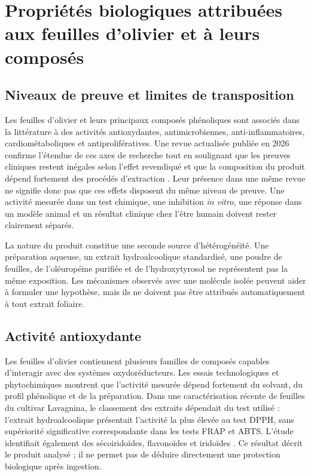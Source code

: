 \section{Propriétés biologiques attribuées aux feuilles d'olivier et à leurs composés}

\subsection{Niveaux de preuve et limites de transposition}

Les feuilles d'olivier et leurs principaux composés phénoliques sont associés dans la littérature à des activités antioxydantes, antimicrobiennes, anti-inflammatoires, cardiométaboliques et antiprolifératives. Une revue actualisée publiée en 2026 confirme l'étendue de ces axes de recherche tout en soulignant que les preuves cliniques restent inégales selon l'effet revendiqué et que la composition du produit dépend fortement des procédés d'extraction \citep{Gokkaya2026}. Leur présence dans une même revue ne signifie donc pas que ces effets disposent du même niveau de preuve. Une activité mesurée dans un test chimique, une inhibition \textit{in vitro}, une réponse dans un modèle animal et un résultat clinique chez l'être humain doivent rester clairement séparés.

La nature du produit constitue une seconde source d'hétérogénéité. Une préparation aqueuse, un extrait hydroalcoolique standardisé, une poudre de feuilles, de l'oléuropéine purifiée et de l'hydroxytyrosol ne représentent pas la même exposition. Les mécanismes observés avec une molécule isolée peuvent aider à formuler une hypothèse, mais ils ne doivent pas être attribués automatiquement à tout extrait foliaire.

\subsection{Activité antioxydante}

Les feuilles d'olivier contiennent plusieurs familles de composés capables d'interagir avec des systèmes oxydoréducteurs. Les essais technologiques et phytochimiques montrent que l'activité mesurée dépend fortement du solvant, du profil phénolique et de la préparation. Dans une caractérisation récente de feuilles du cultivar Lavagnina, le classement des extraits dépendait du test utilisé : l'extrait hydroalcoolique présentait l'activité la plus élevée au test DPPH, sans supériorité significative correspondante dans les tests FRAP et ABTS. L'étude identifiait également des sécoiridoïdes, flavonoïdes et iridoïdes \citep{Betuzzi2025}. Ce résultat décrit le produit analysé ; il ne permet pas de déduire directement une protection biologique après ingestion.

